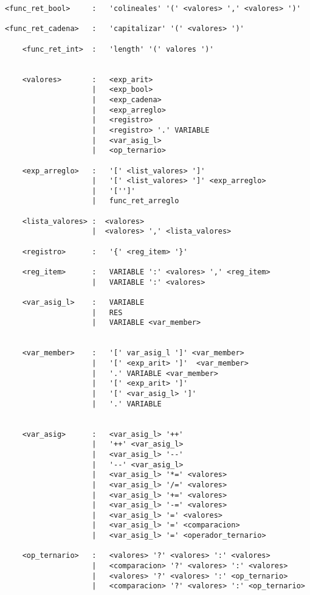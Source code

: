 \begin{verbatim}
<func_ret_bool>     :   'colineales' '(' <valores> ',' <valores> ')'

<func_ret_cadena>   :   'capitalizar' '(' <valores> ')'

    <func_ret_int>  :   'length' '(' valores ')'


    <valores>       :   <exp_arit>
                    |   <exp_bool>
                    |   <exp_cadena>
                    |   <exp_arreglo>
                    |   <registro>
                    |   <registro> '.' VARIABLE
                    |   <var_asig_l>
                    |   <op_ternario>

    <exp_arreglo>   :   '[' <list_valores> ']'
                    |   '[' <list_valores> ']' <exp_arreglo>
                    |   '['']'
                    |   func_ret_arreglo

    <lista_valores> :  <valores>
                    |  <valores> ',' <lista_valores>

    <registro>      :   '{' <reg_item> '}'

    <reg_item>      :   VARIABLE ':' <valores> ',' <reg_item>
                    |   VARIABLE ':' <valores> 

    <var_asig_l>    :   VARIABLE
                    |   RES
                    |   VARIABLE <var_member>


    <var_member>    :   '[' var_asig_l ']' <var_member>
                    |   '[' <exp_arit> ']'  <var_member>
                    |   '.' VARIABLE <var_member>
                    |   '[' <exp_arit> ']' 
                    |   '[' <var_asig_l> ']' 
                    |   '.' VARIABLE 


    <var_asig>      :   <var_asig_l> '++'
                    |   '++' <var_asig_l>
                    |   <var_asig_l> '--'
                    |   '--' <var_asig_l>
                    |   <var_asig_l> '*=' <valores>
                    |   <var_asig_l> '/=' <valores>
                    |   <var_asig_l> '+=' <valores>
                    |   <var_asig_l> '-=' <valores>
                    |   <var_asig_l> '=' <valores>
                    |   <var_asig_l> '=' <comparacion>
                    |   <var_asig_l> '=' <operador_ternario>

    <op_ternario>   :   <valores> '?' <valores> ':' <valores>
                    |   <comparacion> '?' <valores> ':' <valores>
                    |   <valores> '?' <valores> ':' <op_ternario>
                    |   <comparacion> '?' <valores> ':' <op_ternario> 
                

\end{verbatim}
